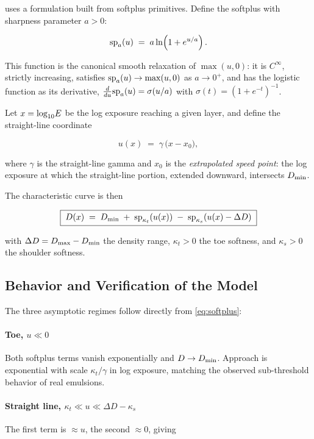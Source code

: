 \EM{} uses a formulation built from softplus primitives. Define the softplus
with sharpness parameter $a > 0$:

\begin{equation}
\mathrm{sp}_{a}\!\left(u\right) \;=\; a \ln\!\left(1 + e^{u/a}\right).
\label{eq:softplus}
\end{equation}

This function is the canonical smooth relaxation of $\max(u, 0)$: it is
$C^\infty$, strictly increasing, satisfies $\mathrm{sp}_{a}\!\left(u\right) \to \max(u,0)$ as $a
\to 0^+$, and has the logistic function as its derivative,
$\tfrac{d}{du}\mathrm{sp}_{a}\!\left(u\right) = \sigma(u/a)$ with $\sigma(t) = (1+e^{-t})^{-1}$.

Let $x = \log_{10}\!E$ be the log exposure reaching a given layer, and define the
straight-line coordinate

\begin{equation}
u(x) \;=\; \gamma\,\big(x - x_{0}\big),
\label{eq:ucoord}
\end{equation}

where $\gamma$ is the straight-line gamma and $x_0$ is the \emph{extrapolated
speed point}: the log exposure at which the straight-line portion, extended
downward, intersects $D_{\min}$.

The characteristic curve is then

\begin{equation}
\boxed{\;D(x) \;=\; D_{\min} \;+\; \mathrm{sp}_{\kappa_t}\!\left(u(x)\right) \;-\; \mathrm{sp}_{\kappa_s}\!\left(u(x) - \Delta D\right)\;}
\label{eq:charcurve}
\end{equation}

with $\Delta D = D_{\max} - D_{\min}$ the density range, $\kappa_t > 0$ the toe
softness, and $\kappa_s > 0$ the shoulder softness.

\subsection{Behavior and Verification of the Model}

The three asymptotic regimes follow directly from \eqref{eq:softplus}:

\paragraph{Toe, $u \ll 0$} Both softplus terms vanish exponentially and $D \to
D_{\min}$. Approach is exponential with scale $\kappa_t/\gamma$ in log exposure,
matching the observed sub-threshold behavior of real emulsions.

\paragraph{Straight line, $\kappa_t \ll u \ll \Delta D - \kappa_s$} The first
term is $\approx u$, the second $\approx 0$, giving

